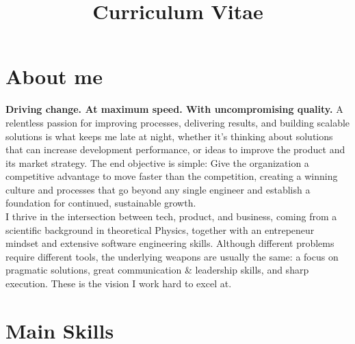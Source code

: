 \documentclass[11pt,a4paper,sans]{moderncv}        %
\title{Curriculum Vitae}                               %
\begin{document}
\makecvtitle

\section{About me}

  \textbf{Driving change. At maximum speed. With uncompromising quality.} A relentless passion for improving processes, delivering results, and building scalable solutions is
  what keeps me late at night, whether it's thinking about solutions that can increase development performance, or ideas to improve the product and its market strategy. The end 
  objective is simple: Give the organization a competitive advantage to move faster than the competition, creating a winning culture and processes that go beyond any single 
  engineer and establish a foundation for continued, sustainable growth. \\

  I thrive in the intersection between tech, product, and business, coming from a scientific background in theoretical Physics, together with an entrepeneur mindset and extensive 
  software engineering skills. Although different problems require different tools, the underlying weapons are usually the same: a focus on pragmatic solutions, great communication \& leadership skills, and sharp execution. 
  These is the vision I work hard to excel at.

\nopagebreak[4]

\section{Main Skills}




\end{document}
